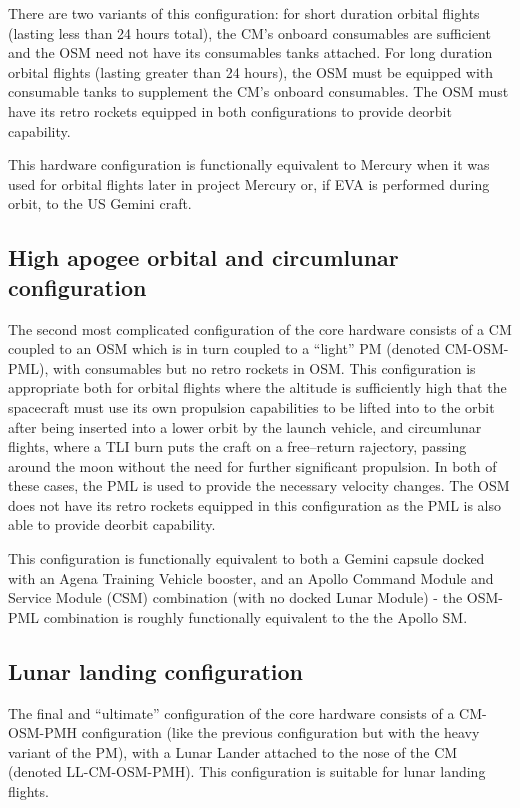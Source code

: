 \documentclass{report}
\begin{document}
There are two variants of this configuration: for short duration orbital flights (lasting less than 24 hours total), the CM's onboard consumables are sufficient and the OSM need not have its consumables tanks attached.  For long duration orbital flights (lasting greater than 24 hours), the OSM must be equipped with consumable tanks to supplement the CM's onboard consumables.  The OSM must have its retro rockets equipped in both configurations to provide deorbit capability.

This hardware configuration is functionally equivalent to Mercury when it was used for orbital flights later in project Mercury or, if EVA is performed during orbit, to the US Gemini craft.

\subsection{High apogee orbital and circumlunar configuration}

The second most complicated configuration of the core hardware consists of a CM coupled to an OSM which is in turn coupled to a ``light'' PM (denoted CM-OSM-PML), with consumables but no retro rockets in OSM.  This configuration is appropriate both for orbital flights where the altitude is sufficiently high that the spacecraft must use its own propulsion capabilities to be lifted into to the orbit after being inserted into a lower orbit by the launch vehicle, and circumlunar flights, where a TLI burn puts the craft on a free--return rajectory, passing around the moon without the need for further significant propulsion.  In both of these cases, the PML is used to provide the necessary velocity changes.  The OSM does not have its retro rockets equipped in this configuration as the PML is also able to provide deorbit capability.

This configuration is functionally equivalent to both a Gemini capsule docked with an Agena Training Vehicle booster, and an Apollo Command Module and Service Module (CSM) combination (with no docked Lunar Module) - the OSM-PML combination is roughly functionally equivalent to the the Apollo SM.

\subsection{Lunar landing configuration}

The final and ``ultimate'' configuration of the core hardware consists of a CM-OSM-PMH configuration (like the previous configuration but with the heavy variant of the PM), with a Lunar Lander attached to the nose of the CM (denoted LL-CM-OSM-PMH).  This configuration is suitable for lunar landing flights.
\end{document}
